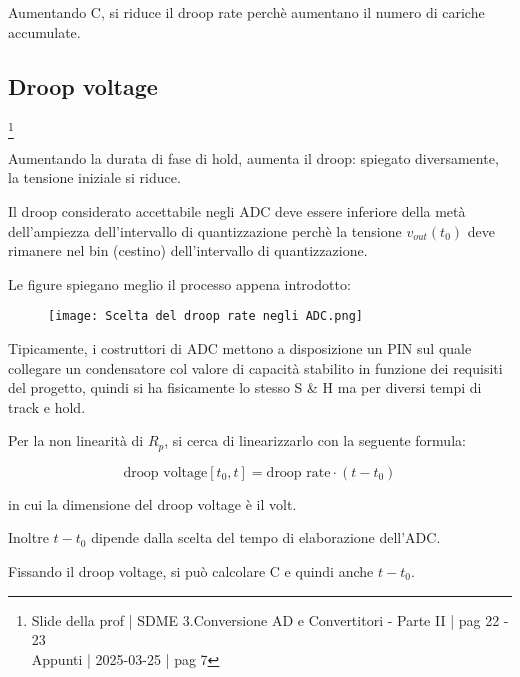 Aumentando C, si riduce il droop rate perchè aumentano il numero di cariche accumulate. \newline 

\newpage 

\subsection{Droop voltage} 
\footnote{Slide della prof | SDME 3.Conversione AD e Convertitori - Parte II | pag 22 - 23 \\  
Appunti | 2025-03-25 | pag 7} 

Aumentando la durata di fase di hold, aumenta il droop: spiegato diversamente, la tensione iniziale si riduce. \newline 

Il droop considerato accettabile negli ADC deve essere inferiore della metà dell'ampiezza dell'intervallo di quantizzazione perchè 
la tensione $v_{out}(t_0)$ deve rimanere nel bin (cestino) dell'intervallo di quantizzazione. \newline 

Le figure spiegano meglio il processo appena introdotto: 

\begin{figure}[h]
    \centering
    \texttt{[image: Scelta del droop rate negli ADC.png]}
\end{figure}

Tipicamente, i costruttori di ADC mettono a disposizione un PIN sul quale collegare un condensatore 
col valore di capacità stabilito in funzione dei requisiti del progetto, quindi si ha fisicamente lo stesso S \& H 
ma per diversi tempi di track e hold. \newline 

Per la non linearità di $R_p$, si cerca di linearizzarlo con la seguente formula: 

{
    \Large 
    \begin{equation}
            \text{droop voltage} [t_0, t] = \text{droop rate} \cdot (t - t_0)
    \end{equation}
}

in cui la dimensione del droop voltage è il volt. \newline 

Inoltre $t-t_0$ dipende dalla scelta del tempo di elaborazione dell'ADC. \newline 

Fissando il droop voltage, si può calcolare C e quindi anche $t-t_0$. \newline 

